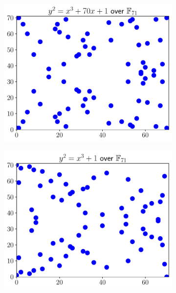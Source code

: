 \begin{figure}[p]
    \begin{subfigure}[t]{0.45\textwidth}
    \includegraphics[width=\textwidth]{plots/ec_finite/ec_finite_F_71_70_1.pdf}
    \end{subfigure}
    \begin{subfigure}[t]{0.45\textwidth}
    \includegraphics[width=\textwidth]{plots/ec_finite/ec_finite_F_71_0_1.pdf}
    \end{subfigure}


\end{figure}

